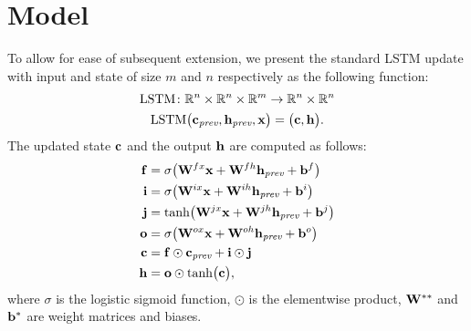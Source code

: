 \section{Model}

To allow for ease of subsequent extension, we present the standard
LSTM update \citep{DBLP:journals/corr/SakSB14} with input and state of
size $m$ and $n$ respectively as the following function:
\begin{gather*}
\operatorname*{LSTM} \colon \mathbb{R}^n\times\mathbb{R}^n \times \mathbb{R}^m \to \mathbb{R}^n \times \mathbb{R}^n \\
\operatorname*{LSTM}\bigl(\mathbf{c}_{\textit{prev}}, \mathbf{h}_{\textit{prev}}, \mathbf{x}\bigr) = \bigl(\mathbf{c}, \mathbf{h}\bigr).
\end{gather*}
%
The updated state $\mathbf{c}$ and the output $\mathbf{h}$ are computed as follows:
\begin{equation}
\label{eq:lstm}
\begin{aligned}
  \mathbf{f} &= \sigma\bigl(\mathbf{W}^{fx} \mathbf{x} + \mathbf{W}^{fh} \mathbf{h}_{\textit{prev}} + \mathbf{b}^f\bigr) \\
  \mathbf{i} &= \sigma\bigl(\mathbf{W}^{ix} \mathbf{x} + \mathbf{W}^{ih} \mathbf{h}_{\textit{prev}} + \mathbf{b}^i\bigr) \\
  \mathbf{j} &= \tanh\bigl(\mathbf{W}^{jx}\mathbf{x} + \mathbf{W}^{jh} \mathbf{h}_{\textit{prev}} + \mathbf{b}^j\bigr) \\
  \mathbf{o} &= \sigma\bigl(\mathbf{W}^{ox} \mathbf{x} + \mathbf{W}^{oh} \mathbf{h}_{\textit{prev}} + \mathbf{b}^o\bigr) \\
  \mathbf{c} &= \mathbf{f} \odot \mathbf{c}_{\textit{prev}} + \mathbf{i} \odot \mathbf{j} \\
  \mathbf{h} &= \mathbf{o} \odot \tanh\bigl(\mathbf{c}\bigr),
\end{aligned}
\end{equation}
where $\sigma$ is the logistic sigmoid function, $\odot$ is the
elementwise product, $\mathbf{W}^{**}$ and $\mathbf{b}^{*}$ are weight matrices and
biases.

